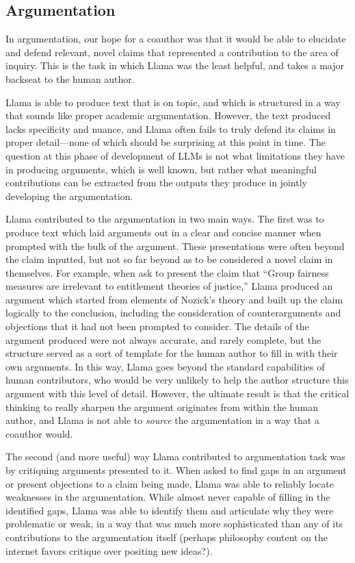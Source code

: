 \subsection{Argumentation}

In argumentation, our hope for a coauthor was that it would be able to elucidate
and defend relevant, novel claims that represented a contribution to the area
of inquiry. This is the task in which Llama was the least helpful, and takes 
a major backseat to the human author.

Llama is able to produce text that is on topic, and which is structured in a way
that sounds like proper academic argumentation. However, the text produced lacks
specificity and nuance, and Llama often fails to truly defend its claims in 
proper detail—none of which should be surprising at this point in time. The
question at this phase of development of LLMs is not what limitations they have
in producing arguments, which is well known, but rather what meaningful 
contributions can be extracted from the outputs they produce in jointly
developing the argumentation.

Llama contributed to the argumentation in two main ways. The first was to
produce text which laid arguments out in a clear and concise manner when
prompted with the bulk of the argument. These presentations were often beyond
the claim inputted, but not so far beyond as to be considered a novel claim in
themselves. For example, when ask to present the claim that ``Group fairness
measures are irrelevant to entitlement theories of justice,'' Llama produced an
argument which started from elements of Nozick's theory and built up the claim
logically to the conclusion, including the consideration of counterarguments and 
objections that it had not been prompted to consider. The details of the
argument produced were not always accurate, and rarely complete, but the
structure served as a sort of template for the human author to fill in with
their own arguments. In this way, Llama goes beyond the standard capabilities of
human contributors, who would be very unlikely to help the author structure this
argument with this level of detail. However, the ultimate result is that the
critical thinking to really sharpen the argument originates from within the
human author, and Llama is not able to \emph{source} the argumentation in a way
that a coauthor would.

The second (and more useful) way Llama contributed to argumentation task was by
critiquing arguments presented to it. When asked to find gaps in an argument or
present objections to a claim being made, Llama was able to reliably locate 
weaknesses in the argumentation. While almost never capable of filling in the
identified gaps, Llama was able to identify them and articulate why they were
problematic or weak, in a way that was much more sophisticated than any of its
contributions to the argumentation itself (perhaps philosophy content on the 
internet favors critique over positing new ideas?).

